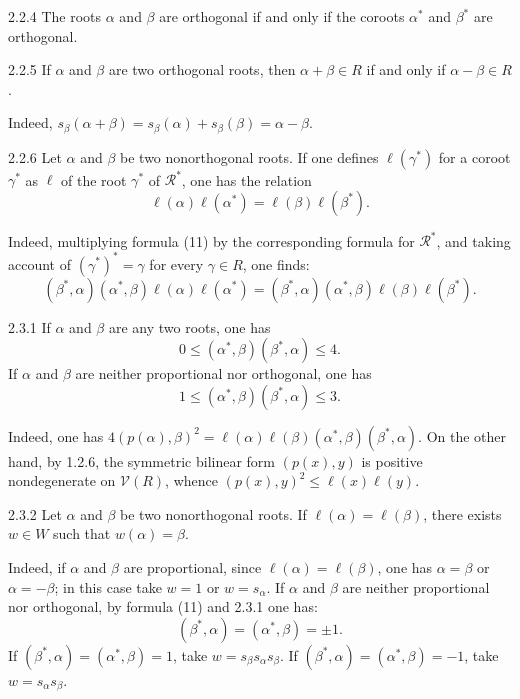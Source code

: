 \begin{remark}{2.2.4}\label{XXI.2.2.4}
The roots $\alpha$ and $\beta$ are orthogonal if and only if the coroots $\alpha^*$ and $\beta^*$ are orthogonal.
\end{remark}
\begin{lemma}{2.2.5}\label{XXI.2.2.5}
If $\alpha$ and $\beta$ are two orthogonal roots, then $\alpha+\beta\in R$ if and only if $\alpha-\beta\in R$.
\end{lemma}
Indeed, $s_\beta(\alpha+\beta)=s_\beta(\alpha)+s_\beta(\beta)=\alpha-\beta$.
\begin{lemma}{2.2.6}\label{XXI.2.2.6}
Let $\alpha$ and $\beta$ be two nonorthogonal roots. If one defines $\ell(\gamma^*)$ for a coroot $\gamma^*$ as $\ell$ of the root $\gamma^*$ of $\mathcal R^*$, one has the relation
\begin{equation}\tag{12}\label{XXI.eq.12}
\ell(\alpha)\ell(\alpha^*)=\ell(\beta)\ell(\beta^*).
\end{equation}
\end{lemma}
Indeed, multiplying formula (11) by the corresponding formula for $\mathcal R^*$, and taking account of $(\gamma^*)^*=\gamma$ for every $\gamma\in R$, one finds:
\[
(\beta^*,\alpha)(\alpha^*,\beta)\ell(\alpha)\ell(\alpha^*)=(\beta^*,\alpha)(\alpha^*,\beta)\ell(\beta)\ell(\beta^*).
\]

\begin{proposition}{2.3.1}\label{XXI.2.3.1}
If $\alpha$ and $\beta$ are any two roots, one has
\begin{equation}\tag{13}\label{XXI.eq.13}
0\leq(\alpha^*,\beta)(\beta^*,\alpha)\leq4.
\end{equation}
If $\alpha$ and $\beta$ are neither proportional nor orthogonal, one has
\[
1\leq(\alpha^*,\beta)(\beta^*,\alpha)\leq3.
\]
\end{proposition}
Indeed, one has $4(p(\alpha),\beta)^2=\ell(\alpha)\ell(\beta)(\alpha^*,\beta)(\beta^*,\alpha)$. On the other hand, by 1.2.6, the symmetric bilinear form $(p(x),y)$ is positive nondegenerate on $\mathcal V(R)$, whence $(p(x),y)^2\leq\ell(x)\ell(y)$.{\renewcommand{\thefootnote}{(4)}}

\begin{corollary}{2.3.2}\label{XXI.2.3.2}
Let $\alpha$ and $\beta$ be two nonorthogonal roots. If $\ell(\alpha)=\ell(\beta)$, there exists $w\in W$ such that $w(\alpha)=\beta$.
\end{corollary}
Indeed, if $\alpha$ and $\beta$ are proportional, since $\ell(\alpha)=\ell(\beta)$, one has $\alpha=\beta$ or $\alpha=-\beta$; in this case take $w=1$ or $w=s_\alpha$. If $\alpha$ and $\beta$ are neither proportional nor orthogonal, by formula (11) and 2.3.1 one has:
\[
(\beta^*,\alpha)=(\alpha^*,\beta)=\pm1.
\]
If $(\beta^*,\alpha)=(\alpha^*,\beta)=1$, take $w=s_\beta s_\alpha s_\beta$. If $(\beta^*,\alpha)=(\alpha^*,\beta)=-1$, take $w=s_\alpha s_\beta$.

